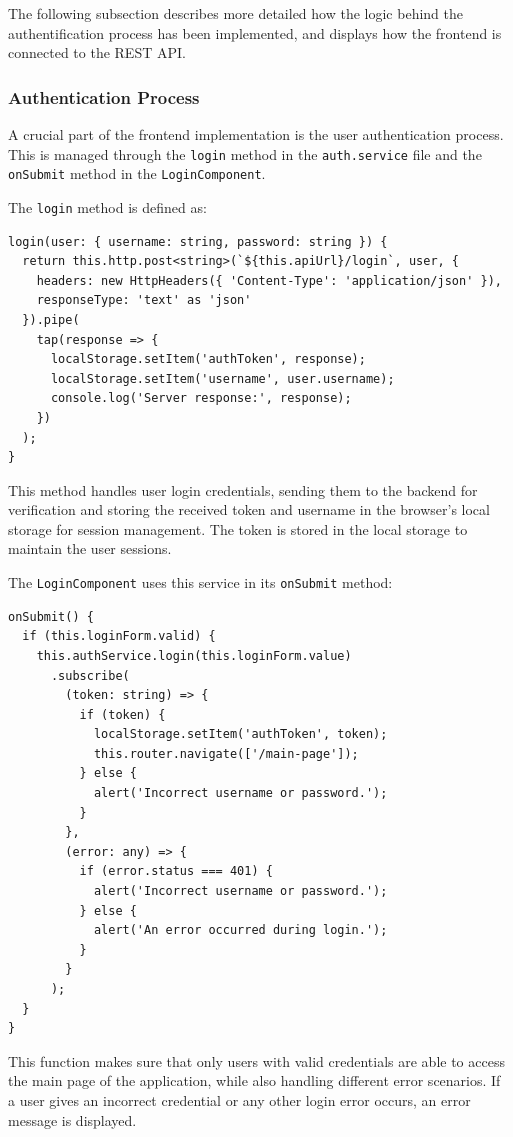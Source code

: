 The following subsection describes more detailed how the logic behind the authentification process has been implemented, 
and displays how the frontend is connected to the REST API. 

\subsubsection{Authentication Process}
A crucial part of the frontend implementation is the user authentication process. 
This is managed through the \texttt{login} method in the \texttt{auth.service} file and the \texttt{onSubmit} method in the \texttt{LoginComponent}.

The \texttt{login} method is defined as:
\begin{verbatim}
login(user: { username: string, password: string }) {
  return this.http.post<string>(`${this.apiUrl}/login`, user, {
    headers: new HttpHeaders({ 'Content-Type': 'application/json' }),
    responseType: 'text' as 'json'
  }).pipe(
    tap(response => {
      localStorage.setItem('authToken', response);
      localStorage.setItem('username', user.username);
      console.log('Server response:', response);
    })
  );
}
\end{verbatim}

This method handles user login credentials, sending them to the backend for verification and storing the received token and 
username in the browser's local storage for session management. The token is stored in the local storage to maintain the user sessions. 

The \texttt{LoginComponent} uses this service in its \texttt{onSubmit} method:
\begin{verbatim}
onSubmit() {
  if (this.loginForm.valid) {
    this.authService.login(this.loginForm.value)
      .subscribe(
        (token: string) => {
          if (token) {
            localStorage.setItem('authToken', token);
            this.router.navigate(['/main-page']);
          } else {
            alert('Incorrect username or password.');
          }
        },
        (error: any) => {
          if (error.status === 401) {
            alert('Incorrect username or password.');
          } else {
            alert('An error occurred during login.');
          }
        }
      );
  }
}
\end{verbatim}

This function makes sure that only users with valid credentials are able to access the main page of the application, while also handling 
different error scenarios. If a user gives an incorrect credential or any other login error occurs, an error message is displayed. 

